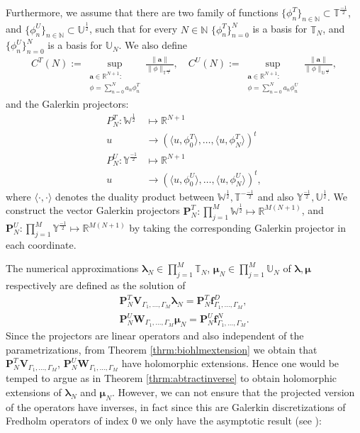 \documentclass{article}
\newcommand{\ba} {\bm a}
\newcommand{\bmu} {\bm{\mu}}
\newcommand{\IN}{{\mathbb N}}
\newcommand{\IR}{{\mathbb R}}
\newcommand{\IU}{{\mathbb U}}
\newcommand{\IT}{{\mathbb T}}
\newcommand{\IW}{{\mathbb W}}
\newcommand{\IY}{{\mathbb Y}}
\newcommand{\bla}{\boldsymbol \lambda}
\begin{document}
 Furthermore, we assume that there are two family of functions $\{\phi^T_n\}_{n\in \IN} \subset \IT^{\frac{-1}{2}}$, and $\{\phi^U_n\}_{n\in \IN} \subset \IU^{\frac{1}{2}}$, such that for every $N \in \IN$ $\{\phi^T_n\}_{n=0}^N$ is a basis for $\IT_N$, and $\{\phi^U_n\}_{n=0}^N$ is a basis for $\IU_N$. We also define 
 \begin{align*}
 C^T(N) := \sup_{ \substack{\ba \in \IR^{N+1}: \\
 			\phi = \sum_{n=0}^N a_n \phi_n^T}} \frac{\| \ba\|}{\|\phi\|_{\IT^{\frac{-1}{2}}}}, \quad 
 			 C^U(N) := \sup_{ \substack{\ba \in \IR^{N+1}: \\
 			\phi = \sum_{n=0}^N a_n \phi_n^U}} \frac{\| \ba\|}{\|\phi\|_{\IU^{\frac{-1}{2}}}},
 \end{align*}
and the Galerkin projectors: 
 \begin{align*}
 P_N^T : \IW^{\frac{1}{2}} &\mapsto \IR^{N+1}    \\
			u &\rightarrow  (\langle u , \phi^T_0\rangle , \hdots ,\langle u , \phi^T_N\rangle )^t \\
			P_N^U : \IY^{\frac{-1}{2}} &\mapsto \IR^{N+1}\\
			u &\rightarrow  (\langle u , \phi^U_0\rangle , \hdots ,\langle u , \phi^U_N\rangle )^t ,
 \end{align*}
 where $\langle \cdot, \cdot \rangle$ denotes the duality product between $\IW^{\frac{1}{2}},\IT^{-\frac{-1}{2}}$ and also $\IY^{\frac{-1}{2}},\IU^{\frac{1}{2}}$.  We construct the vector Galerkin projectors $\mathbf{P}_N^T : \prod_{j=1}^M\IW^{\frac{1}{2}} \mapsto \IR^{M(N+1)}$, and   $\mathbf{P}_N^U : \prod_{j=1}^M\IY^{\frac{-1}{2}} \mapsto \IR^{M(N+1)}$ by taking the corresponding Galerkin projector in each coordinate.
 
  The numerical approximations $\bla_N \in \prod_{j=1}^M \IT_N$,  $\bmu_N \in \prod_{j=1}^M \IU_N$ of $\bla, \bmu$ respectively are defined as the solution of 
 \begin{align*}
  \mathbf{P}_N^T \mathbf{V}_{\Gamma_1,\hdots,\Gamma_M} \bla_N  =   \mathbf{P}_N^T \mathbf{f}^D_{\Gamma_1,\hdots,\Gamma_M},  \\
    \mathbf{P}_N^U \mathbf{W}_{\Gamma_1,\hdots,\Gamma_M} \bmu_N  =  \mathbf{P}_N^U \mathbf{f}^N_{\Gamma_1,\hdots,\Gamma_M}.
 \end{align*}
Since the projectors are linear operators and also independent of the parametrizations, from Theorem \ref{thrm:biohlmextension} we obtain that $\mathbf{P}_N^T \mathbf{V}_{\Gamma_1,\hdots,\Gamma_M}$, $\mathbf{P}_N^U \mathbf{W}_{\Gamma_1,\hdots,\Gamma_M}$ have holomorphic extensions. Hence one would be temped to argue as in Theorem \ref{thrm:abtractinverse} to obtain holomorphic extensions of $\bla_N$ and $\bmu_N$. However, we can not ensure that the projected version of the operators have inverses, in fact since this are Galerkin discretizations of Fredholm operators of index $0$ we only have the asymptotic result (see \cite[Section 4.2.3 ]{Sauter:2011}): 
\end{document}
